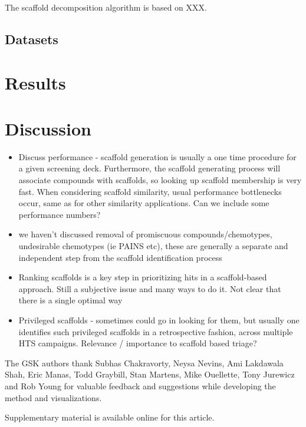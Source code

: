 \documentclass[journal=jacsat,manuscript=article]{achemso}
\begin{document}
The scaffold decomposition algorithm is based on XXX. 

\subsection{Datasets}
\label{sec:datasets}

\section{Results}

\section{Discussion}
\label{sec:discussion}

\begin{itemize}
\item Discuss performance - scaffold generation is usually a one time procedure for a given screening deck. Furthermore, the scaffold generating process will associate compounds with scaffolds, so looking up scaffold membership is very fast. When considering scaffold similarity, usual performance bottlenecks occur, same as for other similarity applications. Can we include some performance numbers?
\item we haven't discussed removal of promiscuous compounds/chemotypes, undesirable chemotypes (ie PAINS etc), these are generally a separate and independent step from the scaffold identification process
\item Ranking scaffolds is a key step in prioritizing hits in a scaffold-based approach. Still a subjective issue and many ways to do it. Not clear that there is a single optimal way
\item Privileged scaffolds - sometimes could go in looking for them, but usually one identifies such privileged scaffolds in a retrospective fashion, across multiple HTS campaigns. Relevance / importance to scaffold based triage?
\end{itemize}

\begin{acknowledgement}
  The GSK authors thank Subhas Chakravorty, Neysa Nevins, Ami Lakdawala Shah,
  Eric Manas, Todd Graybill, Stan Martens, Mike Ouellette, Tony Jurewicz and Rob
  Young for valuable feedback and suggestions while developing the method and
  visualizations.
\end{acknowledgement}

\begin{suppinfo}
Supplementary material is available online for this article.
\end{suppinfo}


\end{document}
